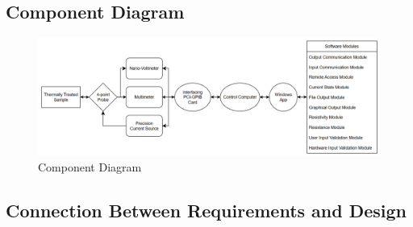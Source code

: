 \documentclass[12pt, titlepage]{article}
\begin{document}
\begin{landscape}
\subsection{Component Diagram}
\begin{figure}[H]
\centerline{\includegraphics[scale=0.5]{ComponentDiagram.png}}
\caption{Component Diagram}
\label{fig}
\end{figure}
\end{landscape}

\subsection{Connection Between Requirements and Design} \label{SecConnection}

\end{document}
